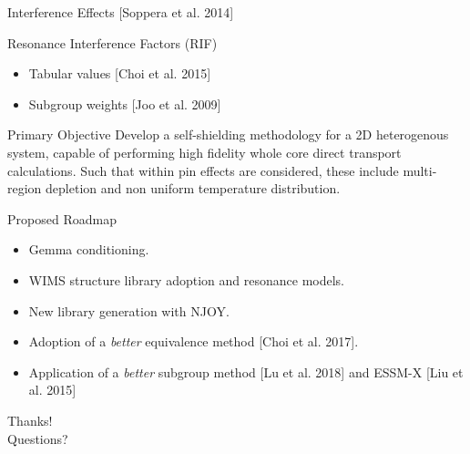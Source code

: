 \documentclass[sans,mathserif,aspectratio=169, 10pt]{beamer}
\begin{document}
\begin{frame}{Interference Effects [Soppera et al. 2014]}
\centering
{}
\end{frame}

\begin{frame}{Resonance Interference Factors (RIF)}
\begin{itemize}
\item<1> Tabular values [Choi et al. 2015]
\item<2> Subgroup weights [Joo et al. 2009]
\end{itemize}
\end{frame}

\begin{frame}{Primary Objective}
\large 
Develop a self-shielding methodology for a 2D heterogenous system, capable of performing high fidelity whole core direct transport calculations. Such that within pin effects are considered, these include multi-region depletion and non uniform temperature distribution. 
\end{frame}

\begin{frame}{Proposed Roadmap}
\begin{itemize}
\item<1> Gemma conditioning.
\item<2> WIMS structure library adoption and resonance models.
\item<3> New library generation with NJOY.
\item<4> Adoption of a \emph{better} equivalence method [Choi et al. 2017].
\item<5> Application of a \emph{better} subgroup method [Lu et al. 2018] and ESSM-X [Liu et al. 2015] 
\end{itemize}
\end{frame}

\begin{frame}
\centering
\Huge
Thanks! \\
Questions?
\end{frame}
\end{document}
